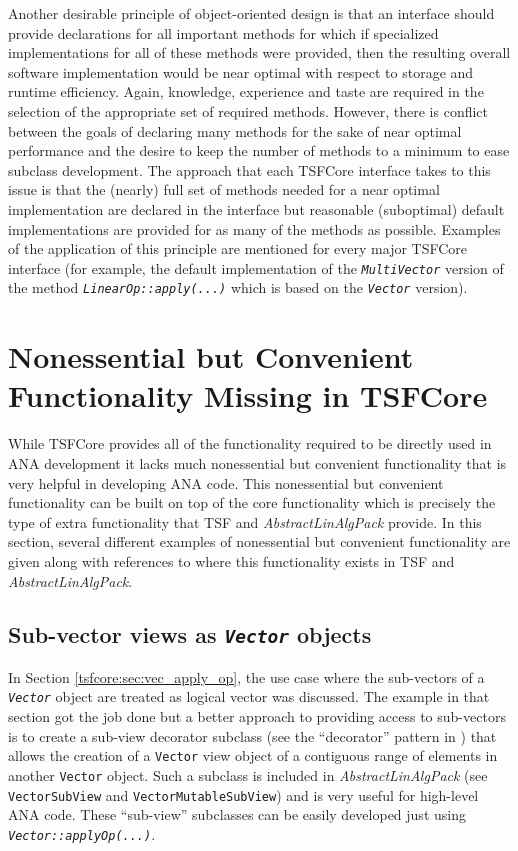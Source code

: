 \documentclass[10pt,fleqn]{article}
\begin{document}
Another desirable principle of object-oriented design is that an
interface should provide declarations for all important methods for
which if specialized implementations for all of these methods were
provided, then the resulting overall software implementation would be
near optimal with respect to storage and runtime efficiency.  Again,
knowledge, experience and taste are required in the selection of the
appropriate set of required methods.  However, there is conflict
between the goals of declaring many methods for the sake of near
optimal performance and the desire to keep the number of methods to a
minimum to ease subclass development.  The approach that each TSFCore
interface takes to this issue is that the (nearly) full set of methods
needed for a near optimal implementation are declared in the interface
but reasonable (suboptimal) default implementations are provided for
as many of the methods as possible.  Examples of the application of
this principle are mentioned for every major TSFCore interface (for
example, the default implementation of the
\texttt{\textit{MultiVector}} version of the method
\texttt{\textit{LinearOp\-::apply(...)}} which is based on
the \texttt{\textit{Vector}} version).

%
\section{Nonessential but Convenient Functionality Missing in TSFCore}
\label{tsfcore:sec:convenience_functionality}
%

While TSFCore provides all of the functionality required to be
directly used in ANA development it lacks much nonessential but convenient
functionality that is very helpful in developing ANA code.  This
nonessential but convenient functionality can be built on top of the core
functionality which is precisely the type of extra functionality that
TSF and \textit{AbstractLinAlgPack} provide.  In this section, several
different examples of nonessential but convenient functionality are given along
with references to where this functionality exists in TSF and
\textit{AbstractLinAlgPack}.

%
\subsection{Sub-vector views as \texttt{\textit{Vector}} objects}
%

In Section \ref{tsfcore:sec:vec_apply_op}, the use case where the
sub-vectors of a \texttt{\textit{Vector}} object are treated as logical
vector was discussed.  The example in that section got the job done
but a better approach to providing access to sub-vectors is to create a
sub-view decorator subclass (see the ``decorator'' pattern in
\cite{ref:gama_et_al_1995}) that allows the creation of a
\texttt{Vector} view object of a contiguous range of elements in
another \texttt{Vector} object.  Such a subclass is included in
\textit{AbstractLinAlgPack} (see \texttt{VectorSubView} and
\texttt{VectorMutableSubView}) and is very useful for high-level ANA
code.  These ``sub-view'' subclasses can be easily developed just
using \texttt{\textit{Vector\-::applyOp(...)}}.
\end{document}
